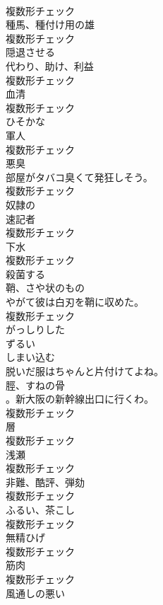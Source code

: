 \documentclass[8pt]{extreport}
\begin{document}
\begin{CJK}{UTF8}{min}
\\	複数形チェック
\\	[名詞]	種馬、種付け用の雄	
\\	複数形チェック
\\	[動詞]	隠退させる	
\\	[名詞]	代わり、助け、利益	
\\	複数形チェック
\\	[名詞]	血清	
\\	複数形チェック
\\	[形容詞]	ひそかな	
\\	[名詞]	軍人	
\\	複数形チェック
\\	[名詞]	悪臭	
\\	部屋がタバコ臭くて発狂しそう。	
\\	複数形チェック
\\	[形容詞]	奴隷の	
\\	[名詞]	速記者	
\\	複数形チェック
\\	[名詞]	下水	
\\	複数形チェック
\\	[動詞]	殺菌する	
\\	[名詞]	鞘、さや状のもの	
\\	やがて彼は白刃を鞘に収めた。	
\\	複数形チェック
\\	[形容詞]	がっしりした	
\\	[形容詞]	ずるい	
\\	[動詞]	しまい込む	
\\	脱いだ服はちゃんと片付けてよね。	
\\	[名詞]	脛、すねの骨	
\\	。新大阪の新幹線出口に行くわ。	
\\	複数形チェック
\\	[名詞]	層	
\\	複数形チェック
\\	[名詞]	浅瀬	
\\	複数形チェック
\\	[名詞]	非難、酷評、弾劾	
\\	複数形チェック
\\	[名詞]	ふるい、茶こし	
\\	複数形チェック
\\	[名詞]	無精ひげ	
\\	複数形チェック
\\	[名詞]	筋肉	
\\	複数形チェック
\\	[形容詞]	風通しの悪い	

\end{CJK}
\end{document}
